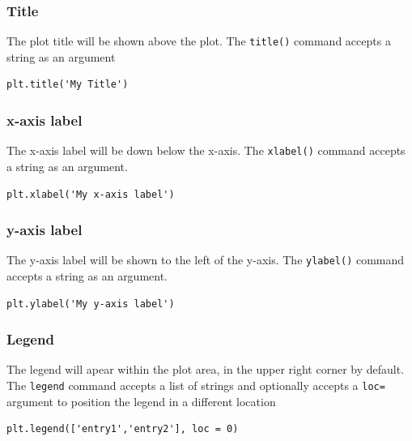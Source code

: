 \documentclass{book}
\begin{document}
    
        \subsubsection{Title}\label{title}

The plot title will be shown above the plot. The \lstinline!title()!
command accepts a string as an argument

\begin{lstlisting}
plt.title('My Title')
\end{lstlisting}
    




    
        \subsubsection{x-axis label}\label{x-axis-label}

The x-axis label will be down below the x-axis. The \lstinline!xlabel()!
command accepts a string as an argument.

\begin{lstlisting}
plt.xlabel('My x-axis label')
\end{lstlisting}
    




    
        \subsubsection{y-axis label}\label{y-axis-label}

The y-axis label will be shown to the left of the y-axis. The
\lstinline!ylabel()! command accepts a string as an argument.

\begin{lstlisting}
plt.ylabel('My y-axis label')
\end{lstlisting}
    




    
        \subsubsection{Legend}\label{legend}

The legend will apear within the plot area, in the upper right corner by
default. The \lstinline!legend! command accepts a list of strings and
optionally accepts a \lstinline!loc=! argument to position the legend in
a different location

\begin{lstlisting}
plt.legend(['entry1','entry2'], loc = 0)
\end{lstlisting}
\end{document}

